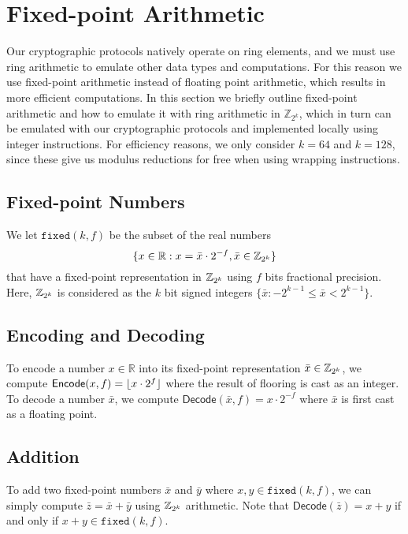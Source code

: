 \section{Fixed-point Arithmetic}
\label{sec:fixed-point}


Our cryptographic protocols natively operate on ring elements, and we must use ring arithmetic to emulate other data types and computations. For this reason we use fixed-point arithmetic instead of floating point arithmetic, which results in more efficient computations. In this section we briefly outline fixed-point arithmetic and how to emulate it with ring arithmetic in $\mathbb{Z}_{2^k}$, which in turn can be emulated with our cryptographic protocols and implemented locally using integer instructions. For efficiency reasons, we only consider $k = 64$ and $k = 128$, since these give us modulus reductions for free when using wrapping instructions.

\subsection{Fixed-point Numbers}
We let $\mathtt{fixed}(k, f)$ be the subset of the real numbers 
$$
\{x \in \mathbb{R} : x = \bar{x} \cdot 2^{-f}, \bar{x} \in \mathbb{Z}_{2^k} \}
$$
that have a fixed-point representation in $\mathbb{Z}_{2^k}$ using $f$ bits fractional precision. Here, $\mathbb{Z}_{2^k}$ is considered as the $k$ bit signed integers $\{ \bar{x} : -2^{k-1} \leq \bar{x} < 2^{k-1} \}$.

\subsection{Encoding and Decoding}
To encode a number $x \in \mathbb{R}$ into its fixed-point representation $\bar{x} \in \mathbb{Z}_{2^k}$, we compute $\mathsf{Encode}(x, f) = \lfloor x \cdot 2^f\rfloor$ where the result of flooring is cast as an integer. To decode a number $\bar{x}$, we compute $\mathsf{Decode}(\bar{x}, f) = x \cdot 2^{-f}$ where $\bar{x}$ is first cast as a floating point.

\subsection{Addition}
To add two fixed-point numbers $\bar{x}$ and $\bar{y}$ where $x,y \in \mathtt{fixed}(k, f)$, we can simply compute $\bar{z} = \bar{x} + \bar{y}$ using $\mathbb{Z}_{2^k}$ arithmetic. Note that $\mathsf{Decode}(\bar{z}) = x + y$ if and only if $x + y \in \mathtt{fixed}(k, f)$.

